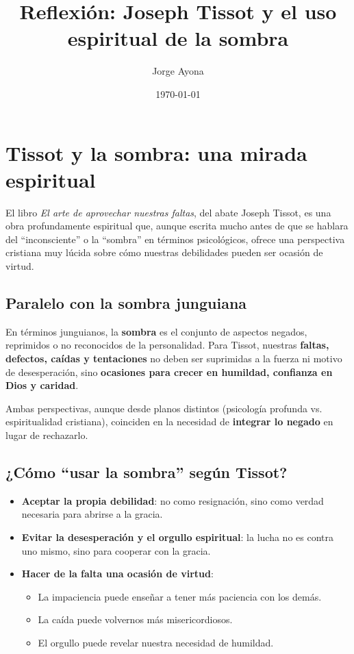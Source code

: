 \documentclass[12pt]{article}
\title{Reflexión: Joseph Tissot y el uso espiritual de la sombra}
\author{Jorge Ayona}
\date{\today}
\begin{document}
\maketitle

\section*{Tissot y la sombra: una mirada espiritual}

El libro \textit{El arte de aprovechar nuestras faltas}, del abate Joseph Tissot, es una obra profundamente espiritual que, aunque escrita mucho antes de que se hablara del ``inconsciente'' o la ``sombra'' en términos psicológicos, ofrece una perspectiva cristiana muy lúcida sobre cómo nuestras debilidades pueden ser ocasión de virtud.

\subsection*{Paralelo con la sombra junguiana}

En términos junguianos, la \textbf{sombra} es el conjunto de aspectos negados, reprimidos o no reconocidos de la personalidad. Para Tissot, nuestras \textbf{faltas, defectos, caídas y tentaciones} no deben ser suprimidas a la fuerza ni motivo de desesperación, sino \textbf{ocasiones para crecer en humildad, confianza en Dios y caridad}.

Ambas perspectivas, aunque desde planos distintos (psicología profunda vs. espiritualidad cristiana), coinciden en la necesidad de \textbf{integrar lo negado} en lugar de rechazarlo.

\subsection*{¿Cómo ``usar la sombra'' según Tissot?}

\begin{itemize}
    \item \textbf{Aceptar la propia debilidad}: no como resignación, sino como verdad necesaria para abrirse a la gracia.
    \item \textbf{Evitar la desesperación y el orgullo espiritual}: la lucha no es contra uno mismo, sino para cooperar con la gracia.
    \item \textbf{Hacer de la falta una ocasión de virtud}:
    \begin{itemize}
        \item La impaciencia puede enseñar a tener más paciencia con los demás.
        \item La caída puede volvernos más misericordiosos.
        \item El orgullo puede revelar nuestra necesidad de humildad.
    \end{itemize}
\end{itemize}
\end{document}
